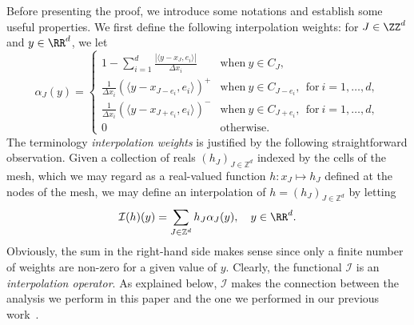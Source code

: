 Before presenting the proof, we introduce some notations and establish some useful properties. We first define the following interpolation weights: for $J\in\ZZ^d$ and $y \in \RR^d$, we let
\begin{equation}\label{def:alpha}
\alpha_J(y) = 
\begin{cases}
 1-\sum_{i=1}^d \frac{|\langle y-{x_J},e_i\rangle|}{\Delta x_i} & \text{when} \ y\in C_J,
\\[0.25em]
 \frac{1}{\Delta x_i}(\langle y-x_{J-e_i},e_i\rangle)^+ &\text{when} \ y\in C_{J-e_i}, \ \ \text{for} \ i= 1,\dots,d,
\\[0.25em]
 \frac{1}{\Delta x_i}(\langle y-x_{J+e_i},e_i\rangle)^- &\text{when} \ y\in C_{J+e_i}, \ \ \text{for} \ i=1,\dots,d,
\\[0.25em]
0 &\text{otherwise}.
\end{cases}
\end{equation}
The terminology \emph{interpolation weights} is justified by the following straightforward observation. Given a collection of reals $(h_{J})_{J \in {\mathbb Z}^d}$ indexed by the cells of the mesh, which we may regard as a real-valued function $h : x_{J} \mapsto h_{J}$ defined at the nodes of the mesh, we may define an interpolation of $h=(h_{J})_{J \in {\mathbb Z}^d}$ by letting
\begin{equation}\label{eq:matchalI}
{\mathcal I}(h)(y) = \sum_{J \in {\mathbb Z}^d} h_{J} \alpha_{J}(y), \quad y \in \RR^d.
\end{equation}
Obviously, the sum in the right-hand side makes sense since only a finite number of weights are non-zero for a given value of $y$. Clearly, the functional ${\mathcal I}$ is an \emph{interpolation operator}. As explained below, ${\mathcal I}$ makes the connection between the analysis we perform in this paper and the one we performed in our previous work~\cite{DLV}.

